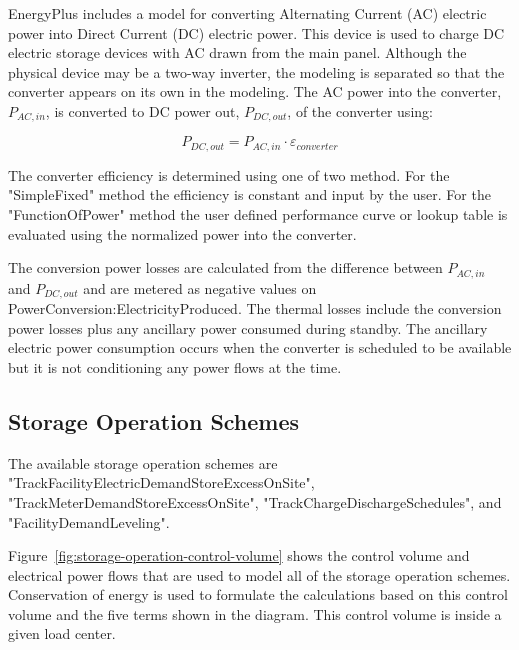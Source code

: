 EnergyPlus includes a model for converting Alternating Current (AC) electric power into Direct Current (DC) electric power.  This device is used to charge DC electric storage devices with AC drawn from the main panel.  Although the physical device may be a two-way inverter, the modeling is separated so that the converter appears on its own in the modeling. The AC power into the converter, ${P_{AC,in}}$, is converted to DC power out, ${P_{DC,out}}$, of the converter using: 

\begin{equation}
  {P_{DC,out}} = {P_{AC,in}} \cdot {\varepsilon_{converter}}
\end{equation}

The converter efficiency is determined using one of two method.  For the "SimpleFixed" method the efficiency is constant and input by the user.  For the "FunctionOfPower" method the user defined performance curve or lookup table is evaluated using the normalized power into the converter.

The conversion power losses are calculated from the difference between ${P_{AC,in}}$ and ${P_{DC,out}}$ and are metered as negative values on PowerConversion:ElectricityProduced.  The thermal losses include the conversion power losses plus any ancillary power consumed during standby.  The ancillary electric power consumption occurs when the converter is scheduled to be available but it is not conditioning any power flows at the time. 

\subsection{Storage Operation Schemes}

The available storage operation schemes are "TrackFacilityElectricDemandStoreExcessOnSite", "TrackMeterDemandStoreExcessOnSite", "TrackChargeDischargeSchedules", and "FacilityDemandLeveling".  

Figure~\ref{fig:storage-operation-control-volume} shows the control volume and electrical power flows that are used to model all of the storage operation schemes.  Conservation of energy is used to formulate the calculations based on this control volume and the five terms shown in the diagram.  This control volume is inside a given load center. 

